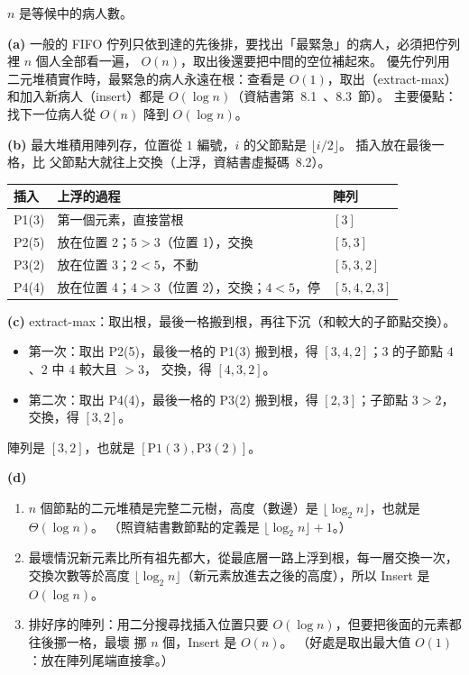 \begin{pastsoln}
$n$ 是等候中的病人數。

\textbf{(a)} 一般的 FIFO 佇列只依到達的先後排，要找出「最緊急」的病人，必須把佇列裡 $n$ 個人全部看一遍，
$O(n)$，取出後還要把中間的空位補起來。 優先佇列用二元堆積實作時，最緊急的病人永遠在根：查看是
$O(1)$，取出（extract-max）和加入新病人（insert）都是 $O(\log n)$（資結書第~8.1~、8.3~節）。 主要優點：
找下一位病人從 $O(n)$ 降到 $O(\log n)$。

\textbf{(b)} 最大堆積用陣列存，位置從 $1$ 編號，$i$ 的父節點是 $\lfloor i/2 \rfloor$。 插入放在最後一格，比
父節點大就往上交換（上浮，資結書虛擬碼~8.2）。
\begin{center}
\begin{tabular}{lll}
\toprule
插入 & 上浮的過程 & 陣列 \\
\midrule
P1(3) & 第一個元素，直接當根 & $[3]$ \\
P2(5) & 放在位置 2；$5 > 3$（位置 1），交換 & $[5, 3]$ \\
P3(2) & 放在位置 3；$2 < 5$，不動 & $[5, 3, 2]$ \\
P4(4) & 放在位置 4；$4 > 3$（位置 2），交換；$4 < 5$，停 & $[5, 4, 2, 3]$ \\
\bottomrule
\end{tabular}
\end{center}
\begin{center}
\end{center}

\textbf{(c)} extract-max：取出根，最後一格搬到根，再往下沉（和較大的子節點交換）。
\begin{itemize}
\item 第一次：取出 P2(5)，最後一格的 P1(3) 搬到根，得 $[3, 4, 2]$；$3$ 的子節點 $4$、$2$ 中 $4$ 較大且 $> 3$，
交換，得 $[4, 3, 2]$。
\item 第二次：取出 P4(4)，最後一格的 P3(2) 搬到根，得 $[2, 3]$；子節點 $3 > 2$，交換，得 $[3, 2]$。
\end{itemize}
陣列是 $[3, 2]$，也就是 $[\text{P1}(3), \text{P3}(2)]$。

\textbf{(d)}
\begin{enumerate}
\item $n$ 個節點的二元堆積是完整二元樹，高度（數邊）是 $\lfloor \log_2 n \rfloor$，也就是 $\Theta(\log n)$。
（照資結書數節點的定義是 $\lfloor \log_2 n \rfloor + 1$。）
\item 最壞情況新元素比所有祖先都大，從最底層一路上浮到根，每一層交換一次，交換次數等於高度
$\lfloor \log_2 n \rfloor$（新元素放進去之後的高度），所以 Insert 是 $O(\log n)$。
\item 排好序的陣列：用二分搜尋找插入位置只要 $O(\log n)$，但要把後面的元素都往後挪一格，最壞
挪 $n$ 個，Insert 是 $O(n)$。 （好處是取出最大值 $O(1)$：放在陣列尾端直接拿。）
\end{enumerate}


\end{pastsoln}
